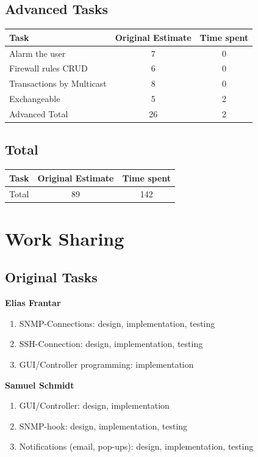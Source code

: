 \documentclass[11pt, a4paper]{article}
\begin{document}
\subsection{Advanced Tasks}
\begin{tabular} {| l | c | c |}\hline
Task &	Original Estimate & Time spent \\ \hline
Alarm the user &	7	& 0 \\ \hline
Firewall rules CRUD &	6 & 	0 \\ \hline
Transactions by Multicast &	8  &	0 \\ \hline
Exchangeable & 5 & 2 \\ \hline
Advanced Total & 26 &	2 \\ \hline
\end{tabular}

\subsection{Total}
\begin{tabular} {| l | c | c |}\hline
	Task &	Original Estimate & Time spent \\ \hline
	Total & 89 & 142 \\ \hline
\end{tabular}

\newpage

\section{Work Sharing}

\subsection{Original Tasks}

\textbf{Elias Frantar}
\begin{enumerate}[noitemsep]
	\item SNMP-Connections: design, implementation, testing
	\item SSH-Connection: design, implementation, testing
	\item GUI/Controller programming: implementation
\end{enumerate}

\noindent \textbf{Samuel Schmidt}
\begin{enumerate}[noitemsep]
	\item GUI/Controller: design, implementation
	\item SNMP-hook: design, implementation, testing
	\item Notifications (email, pop-ups): design, implementation, testing
\end{enumerate}
\end{document}
